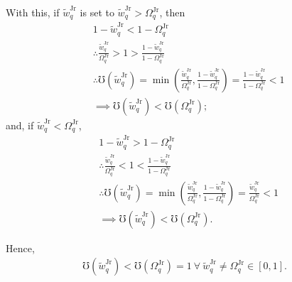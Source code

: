 \documentclass[hidelinks, nonatbib]{elsarticle}
\begin{document}
With this, if $\tilde{w}_{q}^{\text{Jr}}$ is set to $\tilde{w}_{q}^{\text{Jr}} > \Omega_{q}^{\text{Jr}}$, then
\begin{align}
    &
    1 - \tilde{w}_{q}^{\text{Jr}}
    <
    1 - \Omega_{q}^{\text{Jr}}
    \\
    &\therefore
    \frac{
        \tilde{w}_{q}^{\text{Jr}}
    }{
        \Omega_{q}^{\text{Jr}}
    }
    >
    1
    >
    \frac{
        1 - \tilde{w}_{q}^{\text{Jr}}
    }{
        1 - \Omega_{q}^{\text{Jr}}
    }
    \\
    &\therefore
    \mho(\tilde{w}_{q}^{\text{Jr}}) 
    =
    \min\left(
        \frac{
            \tilde{w}_{q}^{\text{Jr}}
        }{
            \Omega_{q}^{\text{Jr}}
        }
        ,
        \frac{
            1 - \tilde{w}_{q}^{\text{Jr}}
        }{
            1 - \Omega_{q}^{\text{Jr}}
        }
    \right)
    =
    \frac{
        1 - \tilde{w}_{q}^{\text{Jr}}
    }{
        1 - \Omega_{q}^{\text{Jr}}
    }
    <
    1
    \\
    &\implies
    \mho(\tilde{w}_{q}^{\text{Jr}})
    <
    \mho(\Omega_{q}^{\text{Jr}})
    ;
\end{align}
and, if $\tilde{w}_{q}^{\text{Jr}} < \Omega_{q}^{\text{Jr}}$,
\begin{align}
    &
    1 - \tilde{w}_{q}^{\text{Jr}}
    >
    1 - \Omega_{q}^{\text{Jr}}
    \\
    &\therefore
    \frac{
        \tilde{w}_{q}^{\text{Jr}}
    }{
        \Omega_{q}^{\text{Jr}}
    }
    <
    1
    <
    \frac{
        1 - \tilde{w}_{q}^{\text{Jr}}
    }{
        1 - \Omega_{q}^{\text{Jr}}
    }
    \\
    &\therefore
    \mho(\tilde{w}_{q}^{\text{Jr}}) 
    =
    \min\left(
        \frac{
            \tilde{w}_{q}^{\text{Jr}}
        }{
            \Omega_{q}^{\text{Jr}}
        }
        ,
        \frac{
            1 - \tilde{w}_{q}^{\text{Jr}}
        }{
            1 - \Omega_{q}^{\text{Jr}}
        }
    \right)
    =
    \frac{
        \tilde{w}_{q}^{\text{Jr}}
    }{
        \Omega_{q}^{\text{Jr}}
    }
    <
    1
    \\
    &\implies
    \mho(\tilde{w}_{q}^{\text{Jr}})
    <
    \mho(\Omega_{q}^{\text{Jr}})
    .
\end{align}

Hence, 
\begin{gather}
    \mho(\tilde{w}_{q}^{\text{Jr}}) < 
    \mho(\Omega_{q}^{\text{Jr}}) 
    = 1
    \
    \forall
    \
    \tilde{w}_{q}^{\text{Jr}}
    \neq
    \Omega_{q}^{\text{Jr}}
    \in [0,1]
    .
\end{gather}
\end{document}
